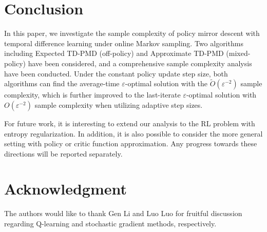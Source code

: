 \documentclass[10pt]{article}
\theoremstyle{plain}
\theoremstyle{definition}
\begin{document}
\section{Conclusion}
\label{sec:conclusion}
In this paper, we investigate the sample complexity of policy mirror descent with temporal difference learning under online Markov sampling. Two algorithms including Expected TD-PMD (off-policy) and Approximate TD-PMD (mixed-policy) have been considered, and  a comprehensive sample complexity analysis have been conducted. Under the constant policy update step size, both algorithms can find the average-time $\varepsilon$-optimal solution with the $\tilde O(\varepsilon^{-2})$ sample complexity, which is further improved to   the last-iterate $\varepsilon$-optimal solution  with $O(\varepsilon^{-2})$ sample complexity when utilizing adaptive step sizes. %

For future work, it is interesting to extend our analysis to the RL problem with entropy regularization. In addition, it is also possible to consider the more general setting with policy or critic function approximation. Any progress towards these directions will be reported separately. 
\section*{Acknowledgment}
The authors would like to thank Gen Li and Luo Luo for fruitful discussion regarding Q-learning and stochastic gradient methods, respectively.


\end{document}
